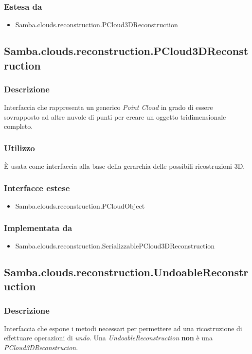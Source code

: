 \subsubsection{Estesa da}
\begin{itemize}
	\item Samba.clouds.reconstruction.PCloud3DReconstruction
\end{itemize}

\subsection{Samba.clouds.reconstruction.PCloud3DReconstruction}
\subsubsection{Descrizione}
Interfaccia che rappresenta un generico \emph{Point Cloud} in grado di essere sovrapposto ad altre nuvole di punti per creare un oggetto tridimensionale completo.
\subsubsection{Utilizzo}
È usata come interfaccia alla base della gerarchia delle possibili ricostruzioni 3D.
\subsubsection{Interfacce estese}
\begin{itemize}
	\item Samba.clouds.reconstruction.PCloudObject
\end{itemize}
\subsubsection{Implementata da}
\begin{itemize}
	\item Samba.clouds.reconstruction.SerializzablePCloud3DReconstruction
\end{itemize}

\subsection{Samba.clouds.reconstruction.UndoableReconstruction}
\subsubsection{Descrizione}
Interfaccia che espone i metodi necessari per permettere ad una ricostruzione di effettuare operazioni di \emph{undo}. Una \emph{UndoableReconstruction} \textbf{non} è una \emph{PCloud3DReconstrucion}. 
